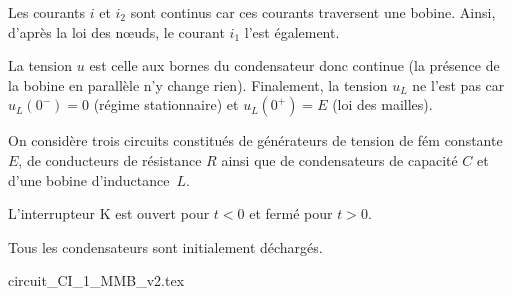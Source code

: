 
\begin{corrigeNewpage}
Les courants $i$ et $i_2$ sont continus car ces courants traversent une bobine. Ainsi, d'après la loi des nœuds, le courant $i_1$ l'est également. 
\par
La tension $u$ est celle aux bornes du condensateur donc continue (la présence de la bobine en parallèle n'y change rien). Finalement, la tension $u_L$ ne l'est pas car $u_L(0^-) = 0$ (régime stationnaire) et $u_L(0^+) = E$ (loi des mailles).
\end{corrigeNewpage}


\finEntrainement







\hauteurLargeurCadreReponse		{6mm}{2cm}
\typeEntrainement				{} %
\initialisationEntrainement

On considère trois circuits constitués de générateurs de tension de fém constante $E$, de conducteurs de résistance $R$ ainsi que de condensateurs de capacité $C$ et d'une bobine d'inductance~$L$.
\par
L'interrupteur K est ouvert pour $t<0$ et fermé pour $t>0$. 

Tous les condensateurs sont initialement déchargés. \minusMedskip
\begin{center}
{circuit_CI_1_MMB_v2.tex}
\end{center}

\debutEntrainement

